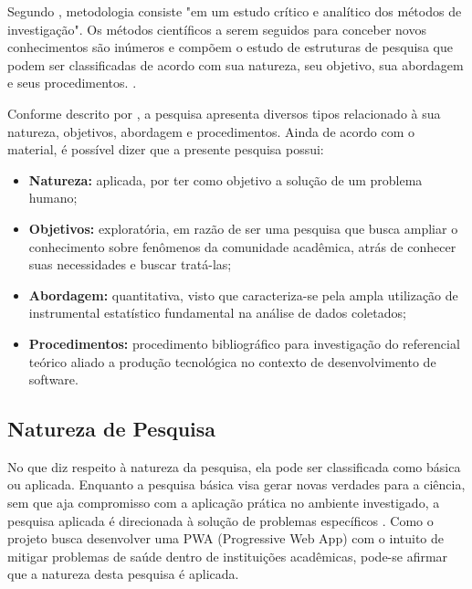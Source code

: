 Segundo , metodologia consiste "em um estudo crítico e analítico dos métodos de investigação". Os métodos científicos a serem seguidos para conceber novos conhecimentos são inúmeros e compõem o estudo de estruturas de pesquisa que podem ser classificadas de acordo com sua natureza, seu objetivo, sua abordagem e seus procedimentos. \cite{nascimento2016classificaccao}. 


Conforme descrito por , a pesquisa apresenta diversos tipos relacionado à sua natureza, objetivos, abordagem e procedimentos. Ainda de acordo com o material, é possível dizer que a presente pesquisa possui:

\begin{itemize}

\item \textbf{Natureza:} aplicada, por ter como objetivo a solução de um problema humano;
\item \textbf{Objetivos:} exploratória, em razão de ser uma pesquisa que busca ampliar o conhecimento sobre fenômenos da comunidade acadêmica, atrás de conhecer suas necessidades e buscar tratá-las; 
\item \textbf{Abordagem:} quantitativa, visto que caracteriza-se pela ampla utilização de instrumental estatístico fundamental na análise de dados coletados;
\item \textbf{Procedimentos:} procedimento bibliográfico para investigação do referencial teórico aliado a produção tecnológica no contexto de desenvolvimento de software.

\end{itemize}

\subsection{Natureza de Pesquisa}
No que diz respeito à natureza da pesquisa, ela pode ser classificada como básica ou aplicada. Enquanto a pesquisa básica visa gerar novas verdades para a ciência, sem que aja compromisso com a aplicação prática no ambiente investigado, a pesquisa aplicada é direcionada à solução de problemas específicos \cite{nascimento2016classificaccao}. Como o projeto busca desenvolver uma PWA (Progressive Web App) com o intuito de mitigar problemas de saúde dentro de instituições acadêmicas, pode-se afirmar que a natureza desta pesquisa é aplicada. 

